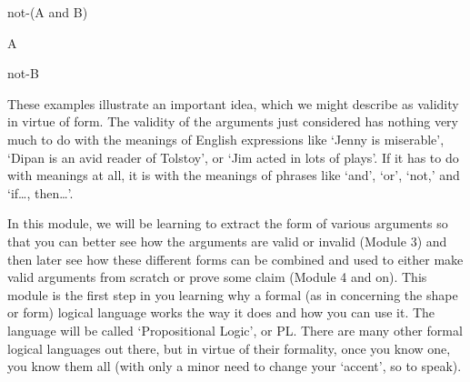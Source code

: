 \begin{center}
\begin{earg}
\item[]not-(A and B)
\item[]A 
\item[\therefore] not-B
\end{earg}
\end{center}
These examples illustrate an important idea, which we might describe as validity in virtue of form. The validity of the arguments just considered has nothing very much to do with the meanings of English expressions like ‘Jenny is miserable’, ‘Dipan is an avid reader of Tolstoy’, or ‘Jim acted in lots of plays’. If it has to do with meanings at all, it is with the meanings of phrases like ‘and’, ‘or’, ‘not,’ and ‘if\ldots, then\ldots’.

In this module, we will be learning to extract the form of various arguments so that you can better see how the arguments are valid or invalid (Module 3) and then later see how these different forms can be combined and used to either make valid arguments from scratch or prove some claim (Module 4 and on). This module is the first step in you learning why a formal (as in concerning the shape or form) logical language works the way it does and how you can use it. The language will be called ‘Propositional Logic', or PL. There are many other formal logical languages out there, but in virtue of their formality, once you know one, you know them all (with only a minor need to change your ‘accent', so to speak).
